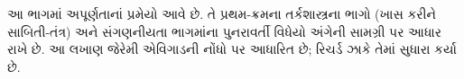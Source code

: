 \documentclass[../../include/open-logic-part]{subfiles}
\begin{document}

\begin{editorial}
 આ ભાગમાં અપૂર્ણતાનાં પ્રમેયો આવે છે. તે પ્રથમ-ક્રમના
 તર્કશાસ્ત્રના ભાગો (ખાસ કરીને સાબિતી-તંત્ર) અને સંગણનીયતા
 ભાગમાંના પુનરાવર્તી વિધેયો અંગેની સામગ્રી પર આધાર રાખે છે.
 આ લખાણ જેરેમી એવિગાડની નોંધો પર આધારિત છે; રિચર્ડ ઝાકે
 તેમાં સુધારા કર્યા છે.
\end{editorial}






\OLEndPartHook
\end{document}
